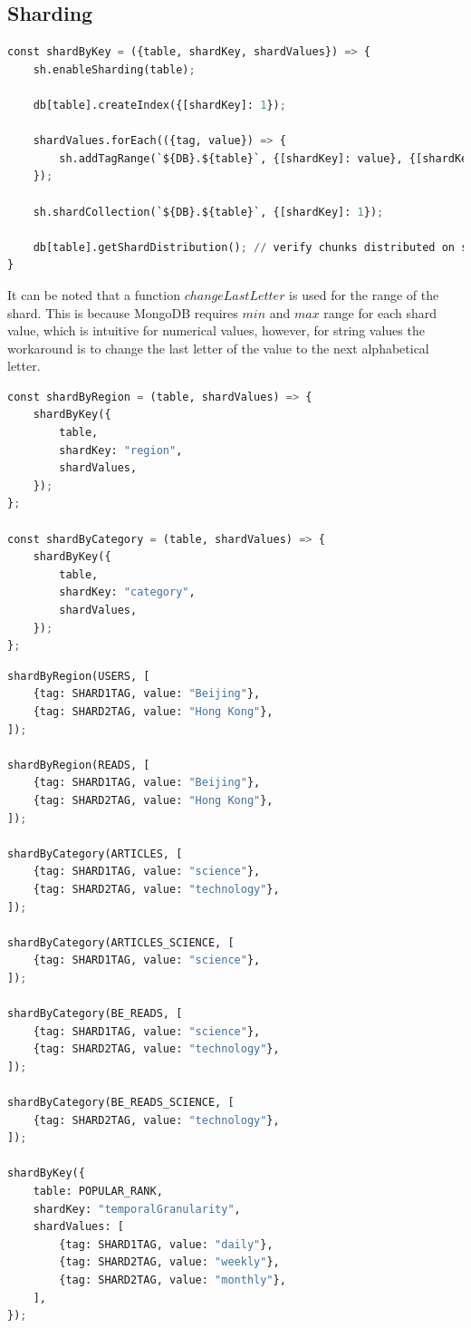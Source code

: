\documentclass{report}
\begin{document}
    \subsection{Sharding}\label{subsec:appendix-sharding}
\begin{lstlisting}[language=python, caption=General sharding function]
const shardByKey = ({table, shardKey, shardValues}) => {
    sh.enableSharding(table);

    db[table].createIndex({[shardKey]: 1});

    shardValues.forEach(({tag, value}) => {
        sh.addTagRange(`${DB}.${table}`, {[shardKey]: value}, {[shardKey]: changeLastLetter(value)}, tag);
    });

    sh.shardCollection(`${DB}.${table}`, {[shardKey]: 1});

    db[table].getShardDistribution(); // verify chunks distributed on shards
}
\end{lstlisting}
    It can be noted that a function $changeLastLetter$ is used for the range of the shard. This is because MongoDB requires $min$ and $max$ range for each shard value, which is intuitive for numerical values, however, for string values the workaround is to change the last letter of the value to the next alphabetical letter.
\begin{lstlisting}[language=python, caption=Sharding per region and category]
const shardByRegion = (table, shardValues) => {
    shardByKey({
        table,
        shardKey: "region",
        shardValues,
    });
};

const shardByCategory = (table, shardValues) => {
    shardByKey({
        table,
        shardKey: "category",
        shardValues,
    });
};
\end{lstlisting}
\begin{lstlisting}[language=python, caption=Sharding of each collection]
shardByRegion(USERS, [
    {tag: SHARD1TAG, value: "Beijing"},
    {tag: SHARD2TAG, value: "Hong Kong"},
]);

shardByRegion(READS, [
    {tag: SHARD1TAG, value: "Beijing"},
    {tag: SHARD2TAG, value: "Hong Kong"},
]);

shardByCategory(ARTICLES, [
    {tag: SHARD1TAG, value: "science"},
    {tag: SHARD2TAG, value: "technology"},
]);

shardByCategory(ARTICLES_SCIENCE, [
    {tag: SHARD1TAG, value: "science"},
]);

shardByCategory(BE_READS, [
    {tag: SHARD1TAG, value: "science"},
    {tag: SHARD2TAG, value: "technology"},
]);

shardByCategory(BE_READS_SCIENCE, [
    {tag: SHARD2TAG, value: "technology"},
]);

shardByKey({
    table: POPULAR_RANK,
    shardKey: "temporalGranularity",
    shardValues: [
        {tag: SHARD1TAG, value: "daily"},
        {tag: SHARD2TAG, value: "weekly"},
        {tag: SHARD2TAG, value: "monthly"},
    ],
});
\end{lstlisting}
\end{document}
